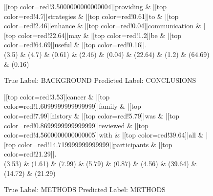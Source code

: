 \documentclass[a4paper, landscape]{article}
\begin{document}
\begin{figure}
\begin{center}
\begin{dependency}
\begin{deptext}
|[top color=red!3.5000000000000004]|providing \& |[top color=red!4.7]|strategies \& |[top color=red!0.61]|to \& |[top color=red!2.46]|enhance \& |[top color=red!0.04]|communication \& |[top color=red!22.64]|may \& |[top color=red!1.2]|be \& |[top color=red!64.69]|useful \& |[top color=red!0.16]|.\\
(3.5) \& (4.7) \& (0.61) \& (2.46) \& (0.04) \& (22.64) \& (1.2) \& (64.69) \& (0.16)\\
\end{deptext}
\end{dependency}
\end{center}
\caption{True Label: BACKGROUND Predicted Label: CONCLUSIONS}
\end{figure}
\clearpage
\begin{figure}
\begin{center}
\begin{dependency}
\begin{deptext}
|[top color=red!3.53]|cancer \& |[top color=red!1.6099999999999999]|family \& |[top color=red!7.99]|history \& |[top color=red!5.79]|was \& |[top color=red!0.8699999999999999]|reviewed \& |[top color=red!4.5600000000000005]|with \& |[top color=red!39.64]|all \& |[top color=red!14.719999999999999]|participants \& |[top color=red!21.29]|.\\
(3.53) \& (1.61) \& (7.99) \& (5.79) \& (0.87) \& (4.56) \& (39.64) \& (14.72) \& (21.29)\\
\end{deptext}
\end{dependency}
\end{center}
\caption{True Label: METHODS Predicted Label: METHODS}
\end{figure}
\clearpage
\end{document}

